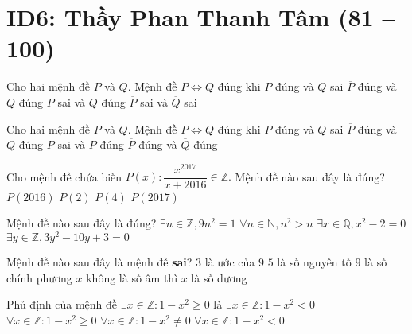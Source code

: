 \section*{ID6: Thầy Phan Thanh Tâm (81 -- 100)}
\begin{ex}%
	Cho hai mệnh đề $P$ và $Q$. Mệnh đề $P\Leftrightarrow Q$ đúng khi
	\choice
	{$P$ đúng và $Q$ sai}
	{$\overline{P}$ đúng và $Q$ đúng}
	{$P$ sai và $Q$ đúng}
	{\True $\overline{P}$  sai và $\overline{Q}$  sai}
\end{ex}
\begin{ex}%
	Cho hai mệnh đề $P$ và $Q$. Mệnh đề $P\Leftrightarrow Q$ đúng khi
	\choice
	{$P$ đúng và $Q$ sai}
	{$\overline{P}$ đúng và $Q$ đúng}
	{$P$ sai và $P$ đúng}
	{\True $\overline{P}$ đúng và $\overline{Q}$ đúng }
\end{ex}

\begin{ex}%
	Cho mệnh đề chứa biến $P(x)\colon \dfrac{x^{2017}}{x+2016}\in\mathbb{Z}.$ Mệnh đề nào sau đây là đúng?
	\choice
	{\True $P(2016)$}
	{$P(2)$}
	{$P(4)$}
	{$P(2017)$}
\end{ex}

\begin{ex}%
	Mệnh đề nào sau đây là đúng? 
	\choice
	{$\exists n \in \mathbb{Z},9n^2=1$}
	{$\forall n \in \mathbb{N},n^2>n$}
	{$\exists x \in \mathbb{Q},x^2-2=0$}
	{\True $\exists y \in \mathbb{Z},3y^2-10y+3=0$}
\end{ex}

\begin{ex}%
	Mệnh đề nào sau đây là mệnh đề \textbf{sai}?
	\choice
	{$3$ là ước của $9$}
	{$5$ là số nguyên tố}
	{$9$ là số chính phương}
	{\True $x$ không là số âm thì $x$ là số dương}
\end{ex}
\begin{ex}%
	Phủ định của mệnh đề  $\exists x\in\mathbb{Z}\colon 1-x^2\geq 0$ là
	\choice
	{$\exists x\in\mathbb{Z}\colon 1-x^2< 0$}
	{$\forall x\in\mathbb{Z}\colon 1-x^2\geq 0$}
	{$\forall x\in\mathbb{Z}\colon 1-x^2\neq 0$}
	{\True $\forall x\in\mathbb{Z}\colon 1-x^2<0$}
\end{ex}

